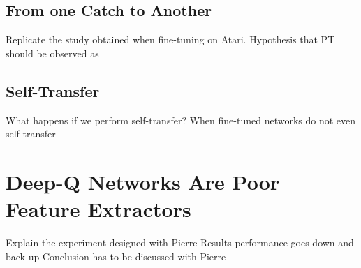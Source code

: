 

\subsection{From one Catch to Another}

 Replicate the study obtained when fine-tuning on Atari. Hypothesis that PT should be observed as 




\subsection{Self-Transfer}

 What happens if we perform self-transfer?
 When fine-tuned networks do not even self-transfer

\section{Deep-Q Networks Are Poor Feature Extractors}

 Explain the experiment designed with Pierre
 Results performance goes down and back up
 Conclusion has to be discussed with Pierre


